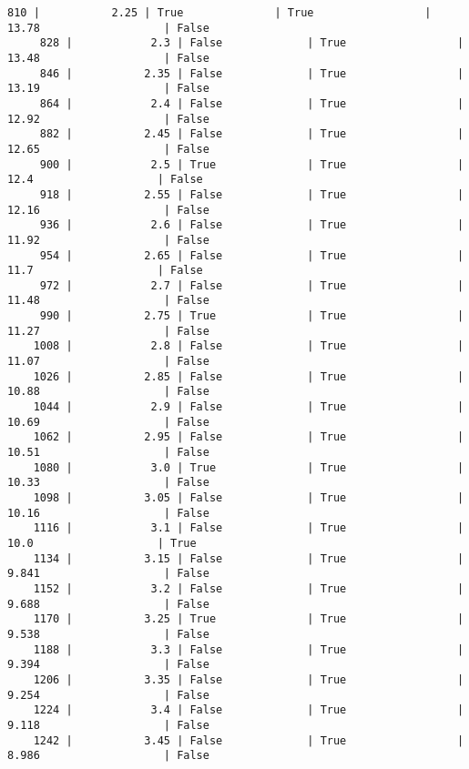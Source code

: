 \documentclass{article}
\begin{document}
\begin{Verbatim}[commandchars=\\\{\}]
     810 |           2.25 | True              | True                 |   13.78                   | False
     828 |            2.3 | False             | True                 |   13.48                   | False
     846 |           2.35 | False             | True                 |   13.19                   | False
     864 |            2.4 | False             | True                 |   12.92                   | False
     882 |           2.45 | False             | True                 |   12.65                   | False
     900 |            2.5 | True              | True                 |    12.4                   | False
     918 |           2.55 | False             | True                 |   12.16                   | False
     936 |            2.6 | False             | True                 |   11.92                   | False
     954 |           2.65 | False             | True                 |    11.7                   | False
     972 |            2.7 | False             | True                 |   11.48                   | False
     990 |           2.75 | True              | True                 |   11.27                   | False
    1008 |            2.8 | False             | True                 |   11.07                   | False
    1026 |           2.85 | False             | True                 |   10.88                   | False
    1044 |            2.9 | False             | True                 |   10.69                   | False
    1062 |           2.95 | False             | True                 |   10.51                   | False
    1080 |            3.0 | True              | True                 |   10.33                   | False
    1098 |           3.05 | False             | True                 |   10.16                   | False
    1116 |            3.1 | False             | True                 |    10.0                   | True
    1134 |           3.15 | False             | True                 |   9.841                   | False
    1152 |            3.2 | False             | True                 |   9.688                   | False
    1170 |           3.25 | True              | True                 |   9.538                   | False
    1188 |            3.3 | False             | True                 |   9.394                   | False
    1206 |           3.35 | False             | True                 |   9.254                   | False
    1224 |            3.4 | False             | True                 |   9.118                   | False
    1242 |           3.45 | False             | True                 |   8.986                   | False

\end{Verbatim}
\end{document}
